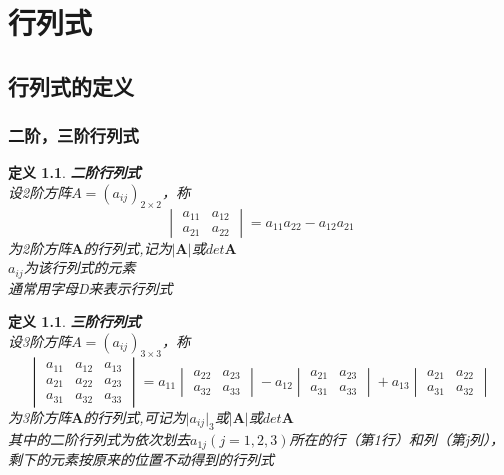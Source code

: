 \documentclass[12pt,oneside]{ctexbook}
\newtheorem{definition}[subsection]{定义}
\begin{document}
\part{行列式}
\chapter{行列式的定义}
\section{二阶，三阶行列式}
\begin{definition}
    \textbf{二阶行列式}
    \\设2阶方阵\(A=(a_{ij})_{2\times 2}\)，称
    \[\begin{vmatrix}
        a_{11}&a_{12}
        \\a_{21}&a_{22}
    \end{vmatrix}=a_{11}a_{22}-a_{12}a_{21}\]
    为2阶方阵\(\mathbf{A}\)的行列式,记为\(\rvert\mathbf{A}\rvert\)或\(det{\mathbf{A}}\)
    \\ \(a_{ij}\)为该行列式的元素
    \\通常用字母D来表示行列式
\end{definition}
\begin{definition}
    \textbf{三阶行列式}
    \\设3阶方阵\(A=(a_{ij})_{3\times 3}\)，称
    \[\begin{vmatrix}
        a_{11}&a_{12}&a_{13}
        \\a_{21}&a_{22}&a_{23}
        \\a_{31}&a_{32}&a_{33}
    \end{vmatrix}=a_{11}
    \begin{vmatrix}
        a_{22}&a_{23}
        \\a_{32}&a_{33}
    \end{vmatrix}-a_{12}
    \begin{vmatrix}
        a_{21}&a_{23}
        \\a_{31}&a_{33}
    \end{vmatrix}+a_{13}
    \begin{vmatrix}
        a_{21}&a_{22}
        \\a_{31}&a_{32}
    \end{vmatrix}\]
    为3阶方阵\(\mathbf{A}\)的行列式,可记为\(\rvert{a_{ij}}\rvert_3\)或\(\rvert\mathbf{A}\rvert\)或\(det{\mathbf{A}}\)
    \\其中的二阶行列式为依次划去\(a_{1j} (j=1,2,3)\)所在的行（第1行）和列（第j列），剩下的元素按原来的位置不动得到的行列式
\end{definition}
\end{document}
